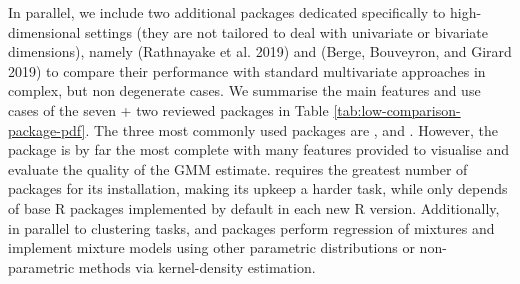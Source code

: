 In parallel, we include two additional packages dedicated specifically to high-dimensional settings (they are not tailored to deal with univariate or bivariate dimensions), namely  (Rathnayake et al. 2019) and  (Berge, Bouveyron, and Girard 2019) to compare their performance with standard multivariate approaches in complex, but non degenerate cases. We summarise the main features and use cases of the seven + two reviewed
packages in Table
\ref{tab:low-comparison-package-pdf}.
The three most commonly used packages are ,  and . However, the  package is by far the most complete with many features provided to visualise and evaluate the quality of the GMM estimate.  requires the greatest number of packages for its installation, making its upkeep
a harder task, while  only depends of base R packages
implemented by default in each new R version. Additionally, in parallel
to clustering tasks,  and  packages perform
regression of mixtures and implement mixture models using other
parametric distributions or non-parametric methods via kernel-density
estimation.

